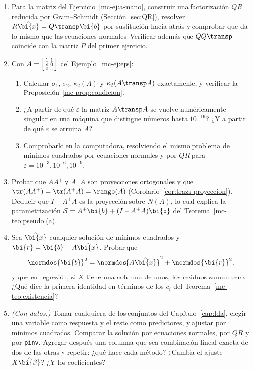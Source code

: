 \begin{enumerate}[leftmargin=*,label=\textbf{\thechapter.\arabic*},ref=\thechapter.\arabic*,itemsep=4pt]
\item\label{mc-ej:QR} Para la matriz del Ejercicio~\ref{mc-ej:a-mano},
construir una factorización $QR$ reducida por Gram--Schmidt
(Sección~\ref{sec:QR}), resolver $R\hat{\bi{x}}=Q\transp\bi{b}$ por sustitución
hacia atrás y comprobar que da lo mismo que las ecuaciones normales.
Verificar además que $QQ\transp$ coincide con la matriz $P$ del primer
ejercicio.

\item\label{mc-ej:condicion} Con $A=\begin{bsmallmatrix}1&1\\ \varepsilon&0\\
0&\varepsilon\end{bsmallmatrix}$ del Ejemplo~\ref{mc-ej:eps}:
\begin{enumerate}[label=\textup{(\alph*)}]
\item Calcular $\sigma_1$, $\sigma_2$, $\kappa_2(A)$ y $\kappa_2(A\transp A)$
exactamente, y verificar la Proposición~\ref{mc-prop:condicion}.
\item ¿A partir de qué $\varepsilon$ la matriz $A\transp A$ se vuelve
numéricamente singular en una máquina que distingue números hasta
$10^{-16}$? ¿Y a partir de qué $\varepsilon$ se arruina $A$?
\item Comprobarlo en la computadora, resolviendo el mismo problema de mínimos
cuadrados por ecuaciones normales y por $QR$ para
$\varepsilon=10^{-3},10^{-6},10^{-9}$.
\end{enumerate}

\item\label{mc-ej:proyecciones} Probar que $AA^{+}$ y $A^{+}A$ son
proyecciones ortogonales y que $\tr(AA^{+})=\tr(A^{+}A)=\rango(A)$
(Corolario~\ref{cor:traza-proyeccion}). Deducir que $I-A^{+}A$ es la
proyección sobre $N(A)$, lo cual explica la parametrización
$\mathcal S=A^{+}\bi{b}+(I-A^{+}A)\bi{z}$ del
Teorema~\ref{mc-teo:pseudo}(a).

\item\label{mc-ej:residuo} Sea $\hat{\bi{x}}$ cualquier solución de mínimos
cuadrados y $\bi{r}=\bi{b}-A\hat{\bi{x}}$. Probar que
\[
\normdos{\bi{b}}^2=\normdos{A\hat{\bi{x}}}^2+\normdos{\bi{r}}^2 ,
\]
y que en regresión, si $X$ tiene una columna de unos, los residuos suman cero.
¿Qué dice la primera identidad en términos de los $c_i$ del
Teorema~\ref{mc-teo:existencia}?

\item\label{mc-ej:datos} \emph{(Con datos.)} Tomar cualquiera de los conjuntos
del Capítulo~\ref{cap:lda}, elegir una variable como respuesta y el resto como
predictores, y ajustar por mínimos cuadrados. Comparar la solución por
ecuaciones normales, por $QR$ y por \texttt{pinv}. Agregar después una columna
que sea combinación lineal exacta de dos de las otras y repetir: ¿qué hace
cada método? ¿Cambia el ajuste $X\hat{\bi{\beta}}$? ¿Y los coeficientes?

\end{enumerate}

